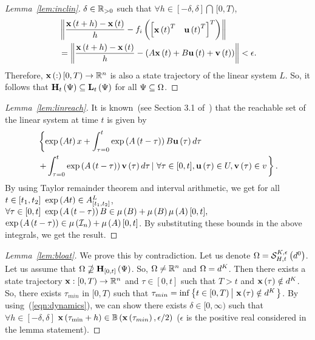 \begin{appendix}
\begin{proof}[Lemma~\ref{lem:inclin}]
$\delta\in\mathbb{R}_{>0}$ such that $\forall
h\in[-\delta,\delta]\bigcap\, [0,T)$,
%
\begin{align*}
& \left\| \frac{ \mathbf{x}\left(t+h\right) - \mathbf{x}\left(t\right) }{h} -
f_i\left( \begin{bmatrix} \mathbf{x}\left(t\right)^T & \mathbf{u}\left(t\right)^T \end{bmatrix}^T \right)\right\|\\
& = \left\| \frac{ \mathbf{x}\left(t+h\right) - \mathbf{x}\left(t\right) }{h} -
\left(A\mathbf{x}\left(t\right) + B\mathbf{u}\left(t\right) + \mathbf{v}\left(t\right)\right) \right\| < \epsilon.
\end{align*}
%
Therefore, $\mathbf{x}\left(:\right)[0,T)\rightarrow \mathbb{R}^n$ is also a state
trajectory of the linear system $L$.  So, it follows that
$\mathbf{H}_{t}\left(\Psi\right)\subseteq \mathbf{L}_{t}\left(\Psi\right)$ for all
$\Psi\subseteq \Omega$.
\end{proof}
%
\begin{proof}[Lemma~\ref{lem:linreach}]
  It is known~(see Section 3.1 of~\cite{girard2005reachability}) that
the reachable set of the linear system at time $t$ is given by
%
\begin{equation*}
\begin{split}
& \left\{\exp\left(At\right)x + \int_{\tau=0}^t\exp\left(A\left(t-\tau\right)\right)B\mathbf{u}\left(\tau\right)
d\tau\right.\\ &\left.
+ \int_{\tau=0}^t\exp\left(A\left(t-\tau\right)\right)\mathbf{v}\left(\tau\right)
d\tau\left|~\forall \tau\in[0,t], \mathbf{u}\left(\tau\right)\in U,\mathbf{v}\left(\tau\right)\in
v\right.\right\}.
\end{split}
\end{equation*}
%
By using Taylor remainder theorem and interval arithmetic, we get for all
$t\in[t_1,t_2]~\exp\left(At\right)\in
{A}^{L}_{[t_1,t_2]}$, $\forall \tau\in[0,t]~\exp\left(A\left(t-\tau\right)\right)B\in\mu\left(B\right)+\mu\left(B\right)\mu\left(A\right)[0,t],$
$\exp\left(A\left(t-\tau\right)\right)\in\mu\left(\mathcal{I}_{n}\right)+\mu\left(A\right)[0,t]$.  By
substituting these bounds in the above integrals, we get the result.
\end{proof}
%
\begin{proof}[Lemma~\ref{lem:bloat}]
We prove this by contradiction.  Let us denote $\Omega
= \mathcal{S}_{H,t}^{K,\epsilon}\left(d^0\right)$.  Let us assume that
$\Omega\nsupseteq \mathbf{H}_{[0,t]}\left(\Psi\right)$.  So, $\Omega\neq\mathbb{R}^n$
and $\Omega = d^K$.  Then there exists a state trajectory
$\mathbf{x}:[0,T)\rightarrow\mathbb{R}^n$ and $\tau\in[0,t]$ such that $T>t$
and $\mathbf{x}\left(\tau\right)\notin d^K$.  So, there exists $\tau_{min}$ in
$[0,T)$ such that $\tau_{min}
= \inf\left\{t\in[0,T)\left|~\mathbf{x}\left(\tau\right)\notin d^K\right.\right\}$.  By
using~(\ref{eqn:dynamics}), we can show there exists
$\delta\in[0,\infty)$ such that $\forall h\in[-\delta,\delta]$
$\mathbf{x}\left(\tau_{\min}+h\right)\in \mathbb{B}\left(\mathbf{x}\left(\tau_{min}\right),\epsilon/2\right)$
($\epsilon$ is the positive real considered in the lemma statement).

\end{proof}
\end{appendix}

